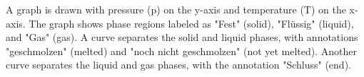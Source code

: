 A graph is drawn with pressure (p) on the y-axis and temperature (T) on the x-axis. The graph shows phase regions labeled as "Fest" (solid), "Flüssig" (liquid), and "Gas" (gas). A curve separates the solid and liquid phases, with annotations "geschmolzen" (melted) and "noch nicht geschmolzen" (not yet melted). Another curve separates the liquid and gas phases, with the annotation "Schluss" (end).